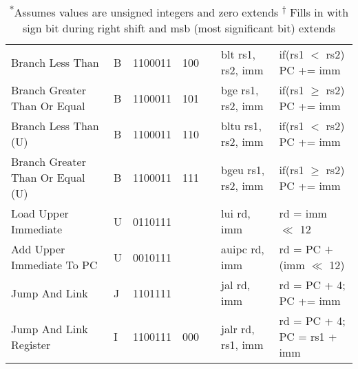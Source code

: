 \begin{table}[h!]
\begin{tabular}{|l|l|l|c|l|l|l|}
        	Branch Less Than                      & B   & 1100011 &  100   &         & blt rs1, rs2, imm   & if(rs1 $<$ rs2) PC += imm      \\
        	Branch Greater Than Or Equal          & B   & 1100011 &  101   &         & bge rs1, rs2, imm   & if(rs1 $\ge$ rs2) PC += imm    \\
        	Branch Less Than (U)\qast             & B   & 1100011 &  110   &         & bltu rs1, rs2, imm  & if(rs1 $<$ rs2) PC += imm      \\
        	Branch Greater Than Or Equal (U)\qast & B   & 1100011 &  111   &         & bgeu rs1, rs2, imm  & if(rs1 $\ge$ rs2) PC += imm    \\
            \hline
        	Load Upper Immediate                  & U   & 0110111 &        &         & lui rd, imm         & rd = imm $\ll$ 12              \\
            \hline
        	Add Upper Immediate To PC             & U   & 0010111 &        &         & auipc rd, imm       & rd = PC $+$ (imm $\ll$ 12)     \\
            \hline
        	Jump And Link                         & J   & 1101111 &        &         & jal rd, imm         & rd = PC + 4; PC += imm         \\
            \hline
        	Jump And Link Register                & I   & 1100111 &  000   &         & jalr rd, rs1, imm   & rd = PC + 4; PC = rs1 + imm    \\
            \hline
        \end{tabular}
        \caption*{\textsuperscript{*}Assumes values are unsigned integers and zero extends \textsuperscript{$\dagger$} Fills in with sign bit during right shift and msb (most significant bit) extends}
    \end{table}

